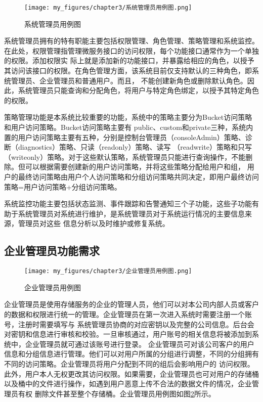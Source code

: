 \begin{figure}[h]
    \centering
    \texttt{[image: my\_figures/chapter3/系统管理员用例图.png]}
    \caption{系统管理员用例图}
    \label{fig:系统管理员用例图}
\end{figure}

系统管理员拥有的特有职能主要包括权限管理、角色管理、策略管理和系统监控。在此处，权限管理指管理微服务接口的访问权限，每个功能接口通常作为一个单独的权限。添加权限实
际上就是添加新的功能接口，并暴露给相应的角色，以授予其访问该接口的权限。在角色管理方面，该系统目前仅支持默认的三种角色，即系统管理员、企业管理员和普通用户。而且，
不能创建新角色或删除默认角色。因此，系统管理员只能查询和分配角色，将用户与特定角色绑定，以授予其特定角色的权限。

策略管理功能是本系统比较重要的功能，系统中的策略主要分为Bucket访问策略和用户访问策略。Bucket访问策略主要有
public、custom和private三种\cite{koi2keji}，系统内置的用户访问策略主要有五种，分别是控制台管理员（consoleAdmin）策略、诊断（diagnostics）策略、只读（readonly）策略、读写
（readwrite）策略和只写（writeonly）策略\cite{kongqingyi}。对于这些默认策略，系统管理员只能进行查询操作，不能删除。但可以根据需要创建新的用户访问策略，并将这些策略分配给用户和组，
用户的最终访问策略由用户个人访问策略和分组访问策略共同决定，即用户最终访问策略=用户访问策略+分组访问策略。

系统监控功能主要包括状态监测、事件跟踪和告警通知三个子功能，这些子功能有助于系统管理员对系统进行维护，是系统管理员对于系统运行情况的主要信息来源，管理员对这些
信息分析以及时维护或修复系统。

\subsection{企业管理员功能需求}

\begin{figure}[h]
    \centering
    \texttt{[image: my\_figures/chapter3/企业管理员用例图.png]}
    \caption{企业管理员用例图} 
    \label{fig:企业管理员用例图}
\end{figure}

企业管理员是使用存储服务的企业的管理人员，他们可以对本公司内部人员或客户的数据和权限进行统一的管理。企业管理员在第一次进入系统时需要注册一个账号，注册时需要填写与
系统管理员协商的对应密钥以及完整的公司信息。后台会对密钥和信息进行审核和校验。一旦审核通过，用户账号的相关信息将被添加到系统中，企业管理员就可通过该账号进行登录。
企业管理员可对该公司客户的用户信息和分组信息进行管理。他们可以对用户所属的分组进行调整，不同的分组拥有不同的访问策略。企业管理员将用户分配到不同的组后会影响用户的
访问权限。此外，用户本人无权更改其访问权限。如果需要，企业管理员也可对用户的存储桶以及桶中的文件进行操作，如遇到用户恶意上传不合法的数据文件的情况，企业管理员有权
删除文件甚至整个存储桶\cite{kqingg201eji}。企业管理员用例图如图\ref{fig:企业管理员用例图}所示。




